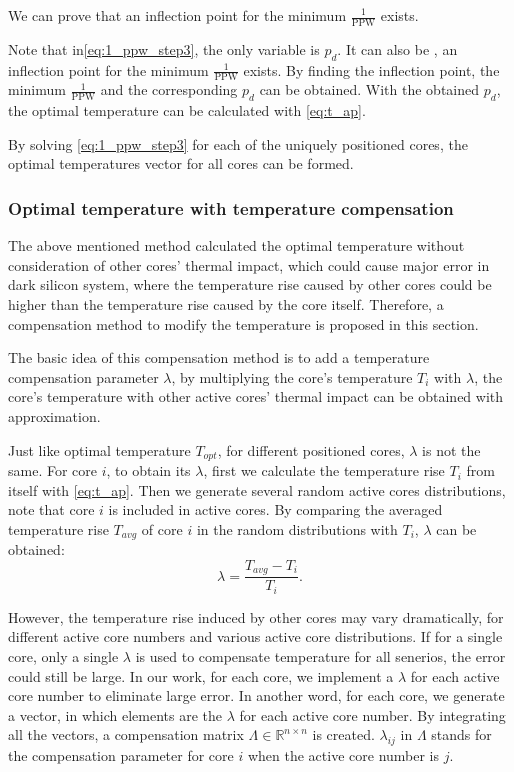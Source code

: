 We can prove that an inflection point for the minimum $\frac{1}{\text{PPW}}$ exists.

Note that in\eqref{eq:1_ppw_step3}, the only variable is $p_{d}$. It can also be , an inflection point for the minimum $\frac{1}{\text{PPW}}$ exists. By finding the inflection point, the minimum $\frac{1}{\text{PPW}}$ and the corresponding $p_{d}$ can be obtained. With the obtained $p_{d}$, the optimal temperature can be calculated with \eqref{eq:t_ap}.

By solving \eqref{eq:1_ppw_step3} for each of the uniquely positioned cores, the optimal temperatures vector for all cores can be formed.


\subsubsection{Optimal temperature with temperature compensation}

The above mentioned method calculated the optimal temperature without consideration of other cores' thermal impact, which could cause major error in dark silicon system, where the temperature rise caused by other cores could be higher than the temperature rise caused by the core itself. Therefore, a compensation method to modify the temperature is proposed in this section.

The basic idea of this compensation method is to add a temperature compensation parameter $\lambda$, by multiplying the core's temperature $T_{i}$ with $\lambda$, the core's temperature with other active cores' thermal impact can be obtained with approximation.

Just like optimal temperature $T_{opt}$, for different positioned cores, $\lambda$ is not the same. For core $i$, to obtain its $\lambda$, first we calculate the temperature rise $T_{i}$ from itself with \eqref{eq:t_ap}. Then we generate several random active cores distributions, note that core $i$ is included in active cores. By comparing the averaged temperature rise $T_{avg}$ of core $i$ in the random distributions with $T_{i}$, $\lambda$ can be obtained:
\begin{equation}\label{eq:lambda}
\lambda = \frac{T_{avg}-T_{i}}{T_{i}}.
\end{equation}

However, the temperature rise induced by other cores may vary dramatically, for different active core numbers and various active core distributions. If for a single core, only a single $\lambda$ is used to compensate temperature for all senerios, the error could still be large. In our work, for each core, we implement a $\lambda$ for each active core number to eliminate large error. In another word, for each core, we generate a vector, in which elements are the $\lambda$ for each active core number. By integrating all the vectors, a compensation matrix $\Lambda \in \mathbb{R}^{n \times n}$ is created. $\lambda_{ij}$ in $\Lambda$ stands for the compensation parameter for core $i$ when the active core number is $j$.

